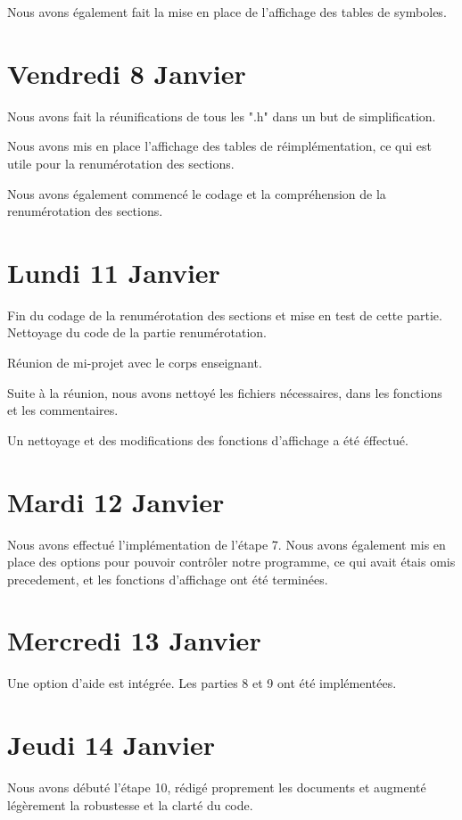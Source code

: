 \documentclass[12pt, a4paper]{article}
\begin{document}
Nous avons également fait la mise en place de l’affichage des tables de symboles.

\section{Vendredi 8 Janvier}

Nous avons fait la réunifications de tous les ".h" dans un but de 
simplification.

Nous avons mis en place l’affichage des tables de r\'eimplémentation, ce qui 
est utile pour la renumérotation des sections.

Nous avons également commencé le codage et la compréhension de la 
renumérotation des sections. 

\section{Lundi 11 Janvier}

Fin du codage de la renumérotation des sections et mise en test de cette partie.
Nettoyage du code de la partie renumérotation.

Réunion de mi-projet avec le corps enseignant.

Suite à la réunion, nous avons nettoyé les fichiers nécessaires, dans les 
fonctions et les commentaires. 

Un nettoyage et des modifications des fonctions d'affichage a été éffectué.


\section{Mardi 12 Janvier}

Nous avons effectué l'implémentation de l'étape 7.
Nous avons également mis en place des options pour pouvoir contrôler notre programme, ce qui avait 
étais omis precedement, et les fonctions d'affichage ont été terminées.

\section{Mercredi 13 Janvier}

Une option d'aide est intégrée.
Les parties 8 et 9 ont été implémentées.

\section{Jeudi 14 Janvier}

Nous avons débuté l'étape 10, rédigé proprement les documents et augmenté légèrement la robustesse et la clarté du code.
\end{document}
